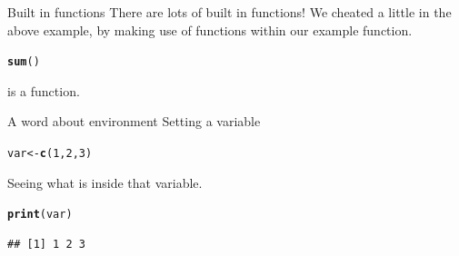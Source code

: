 \documentclass{beamer}\usepackage[]{graphicx}\usepackage[]{color}
\makeatletter
\newcommand{\hlnum}[1]{\textcolor[rgb]{0.686,0.059,0.569}{#1}}%
\newcommand{\hlstd}[1]{\textcolor[rgb]{0.345,0.345,0.345}{#1}}%
\newcommand{\hlkwb}[1]{\textcolor[rgb]{0.69,0.353,0.396}{#1}}%
\newcommand{\hlkwd}[1]{\textcolor[rgb]{0.737,0.353,0.396}{\textbf{#1}}}%
\newenvironment{kframe}{%
 \def\at@end@of@kframe{}%
 \ifinner\ifhmode%
  \def\at@end@of@kframe{\end{minipage}}%
  \begin{minipage}{\columnwidth}%
 \fi\fi%
 \def\FrameCommand##1{\hskip\@totalleftmargin \hskip-\fboxsep
 \colorbox{shadecolor}{##1}\hskip-\fboxsep
     \hskip-\linewidth \hskip-\@totalleftmargin \hskip\columnwidth}%
 \MakeFramed {\advance\hsize-\width
   \@totalleftmargin\z@ \linewidth\hsize
   \@setminipage}}%
 {\par\unskip\endMakeFramed%
 \at@end@of@kframe}
\newenvironment{knitrout}{}{} %
\makeatother
\begin{document}
\begin{frame}[fragile]{Built in functions}
There are lots of built in functions!
\linebreak
We cheated a little in the above example, by making use of functions within our example function.
\linebreak
\linebreak
\begin{knitrout}
\color{fgcolor}\begin{kframe}
\begin{alltt}
\hlkwd{sum}\hlstd{()}
\end{alltt}
\end{kframe}
\end{knitrout}

is a function.

\end{frame}


\begin{frame}[fragile]{A word about environment}
Setting a variable
\begin{knitrout}
\color{fgcolor}\begin{kframe}
\begin{alltt}
\hlstd{var} \hlkwb{<-} \hlkwd{c}\hlstd{(}\hlnum{1}\hlstd{,} \hlnum{2}\hlstd{,} \hlnum{3}\hlstd{)}
\end{alltt}
\end{kframe}
\end{knitrout}

Seeing what is inside that variable.
\begin{knitrout}
\color{fgcolor}\begin{kframe}
\begin{alltt}
\hlkwd{print}\hlstd{(var)}
\end{alltt}
\begin{verbatim}
## [1] 1 2 3
\end{verbatim}
\end{kframe}
\end{knitrout}

\end{frame}
\end{document}
